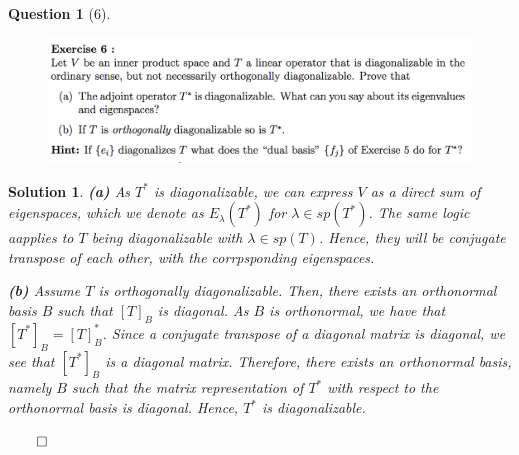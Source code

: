 \documentclass{article} %
\theoremstyle{quest}
\newtheorem*{question}{Question}
\newtheorem*{solution}{Solution}
\begin{document}
\newpage

\begin{question}[6]
\hfill
\begin{figure}[h!]
  \centering
    \includegraphics[width=1\textwidth]{LA-2-6.png}
\end{figure}
\end{question}
\begin{solution}
\textbf{(a)} As $T^*$ is diagonalizable, we can express $V$ as a direct sum of 
eigenspaces, which we denote as $E_{\lambda}(T^*)$ for $\lambda \in sp(T^*)$.
The same logic aapplies to $T$ being diagonalizable with $\lambda \in sp(T)$.
Hence, they will be conjugate transpose of each other, with the corrpsponding
eigenspaces. 

\smallskip

\textbf{(b)} Assume $T$ is orthogonally diagonalizable. Then, there exists an orthonormal 
basis $B$ such that $[T]_{B}$ is diagonal. As $B$ is orthonormal, we have that $[T^*]_{B}
= [T]_{B}^*$. Since a conjugate transpose of a diagonal matrix is diagonal, we see that
$[T^*]_{B}$ is a diagonal matrix. Therefore, there exists an orthonormal basis, namely $B$
such that the matrix representation of $T^*$ with respect to the orthonormal basis is diagonal.
Hence, $T^*$ is diagonalizable. 

\hfill $\qed$
  
\end{solution}

\newpage
\end{document}
